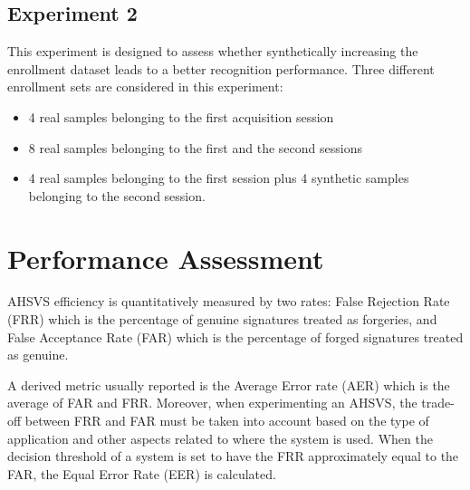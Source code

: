 \subsection{Experiment 2}

This experiment is designed to assess whether synthetically increasing the enrollment dataset leads to a better recognition performance. Three different enrollment sets are considered in this experiment: 
\begin{itemize}
  \item 4 real samples belonging to the
  first acquisition session
  \item 8 real samples belonging to the first and
  the second sessions
  \item 4 real samples belonging
  to the first session plus 4 synthetic samples belonging
  to the second session.
\end{itemize}

\section{Performance Assessment}

AHSVS efficiency is quantitatively measured by two rates: False Rejection Rate (FRR) which is the percentage of genuine signatures treated as forgeries, and False
Acceptance Rate (FAR) which is the percentage of forged signatures treated as
genuine. 

A derived metric usually reported is the Average Error rate (AER) which is the average of FAR and FRR. Moreover, when experimenting an AHSVS, the trade-off between FRR and FAR must be taken into account based on the type of application and other aspects related to where the system is used. When the decision threshold of a system is set to have the FRR approximately equal to the FAR, the Equal Error Rate (EER) is calculated.

